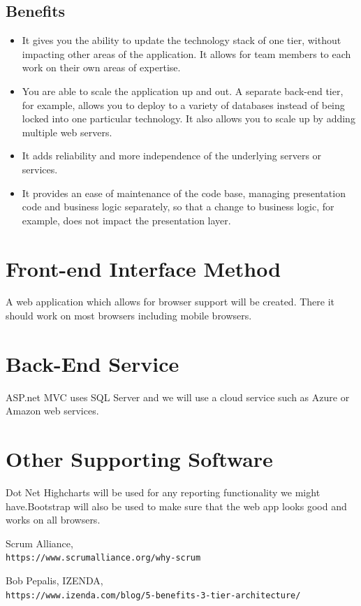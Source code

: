 \documentclass{article}
\begin{document}
\subsection*{Benefits}
\begin{itemize}
\item It gives you the ability to update the technology stack of one tier, without impacting other areas of the application.
It allows for team members to each work on their own areas of expertise.
\item You are able to scale the application up and out. A separate back-end tier, for example, allows you to deploy to a variety of databases instead of being locked into one particular technology. It also allows you to scale up by adding multiple web servers.
\item It adds reliability and more independence of the underlying servers or services.
\item It provides an ease of maintenance of the code base, managing presentation code and business logic separately, so that a change to business logic, for example, does not impact the presentation layer. \cite{tier}
\end{itemize}

\section*{Front-end Interface Method}
A web application which allows for browser support will be created. There it should work on most browsers including mobile browsers.

\section*{Back-End Service}
ASP.net MVC uses SQL Server and we will use a cloud service such as Azure or Amazon web services.

\section*{Other Supporting Software}
Dot Net Highcharts will be used for any reporting functionality we might have.Bootstrap will also be used to make sure that the web app looks good and works on all browsers. \\

\begin{thebibliography}{9}
Scrum Alliance, \\
\texttt{https://www.scrumalliance.org/why-scrum}

Bob Pepalis, IZENDA, \\
\texttt{https://www.izenda.com/blog/5-benefits-3-tier-architecture/}

\end{thebibliography}
\end{document}
